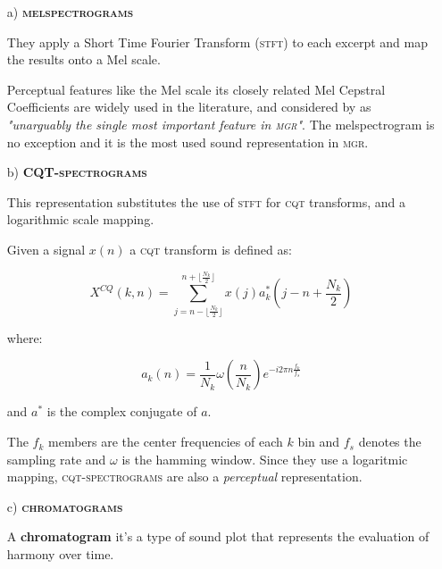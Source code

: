 \begin{enumerate}

  \item [a)] { {\bf \textsc{melspectrograms}}}

  \item [] {
    They apply a Short Time Fourier Transform (\textsc{stft}) to each excerpt and map the results onto a Mel scale.

    Perceptual features like the Mel scale its closely related Mel Cepstral Coefficients are widely used in the literature, and considered by \citet{zhou} as {\it "unarguably the single most important feature in \textsc{\textsc{mgr}}"}. The melspectrogram is no exception and it is the most used sound representation in \textsc{\textsc{mgr}}.
  }

  \item [b)] {{\bf \textsc{CQT-spectrograms}} \citep{cqt}}

  \item [] {
    This representation substitutes the use of \textsc{stft} for \textsc{cqt} transforms, and a logarithmic scale mapping.

    Given a signal $x(n)$ a \textsc{cqt} transform is defined as:

    \begin{equation}
      X^{CQ}(k,n) = \sum_{j = n - \lfloor \frac{N_k}{2} \rfloor}^{n + \lfloor \frac{N_k}{2} \rfloor} x(j) a^{*}_{k}(j - n + \frac{N_k}{2})
    \end{equation}

    where:

    \begin{equation}
      a_{k}(n) = \frac{1}{N_k} \omega (\frac{n}{N_k}) e^{-i 2\pi n \frac{f_k}{f_s}}
    \end{equation}

    and $a^{*}$ is the complex conjugate of $a$.

    The $f_k$ members are the center frequencies of each $k$ bin and $f_s$ denotes the sampling rate and $\omega$ is the hamming window. Since they use a logaritmic mapping, \textsc{cqt-spectrograms} are also a {\it perceptual} representation.
  }

  \item [c)] {{\bf \textsc{chromatograms}} \citep{chroma}}

  \item [] {
    A {\bf chromatogram} it's a type of sound plot that represents the evaluation of harmony over time.

}
\end{enumerate}
